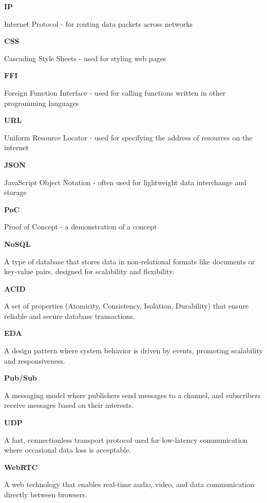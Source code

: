\documentclass[]{final}
\begin{document}
\textbf{IP}

Internet Protocol - for routing data packets across networks

\textbf{CSS}

Cascading Style Sheets - used for styling web pages

\textbf{FFI}

Foreign Function Interface - used for calling functions written in other programming languages

\textbf{URL}

Uniform Resource Locator - used for specifying the address of resources on the internet

\textbf{JSON}

JavaScript Object Notation - often used for lightweight data interchange and storage

\textbf{PoC}

Proof of Concept - a demonstration of a concept

\textbf{NoSQL}

A type of database that stores data in non-relational formats like documents or key-value pairs, designed for scalability and flexibility.

\textbf{ACID}

A set of properties (Atomicity, Consistency, Isolation, Durability) that ensure reliable and secure database transactions.

\textbf{EDA}

A design pattern where system behavior is driven by events, promoting scalability and responsiveness.

\textbf{Pub/Sub}

A messaging model where publishers send messages to a channel, and subscribers receive messages based on their interests.

\textbf{UDP}

A fast, connectionless transport protocol used for low-latency communication where occasional data loss is acceptable.

\textbf{WebRTC}

A web technology that enables real-time audio, video, and data communication directly between browsers.
\end{document}
